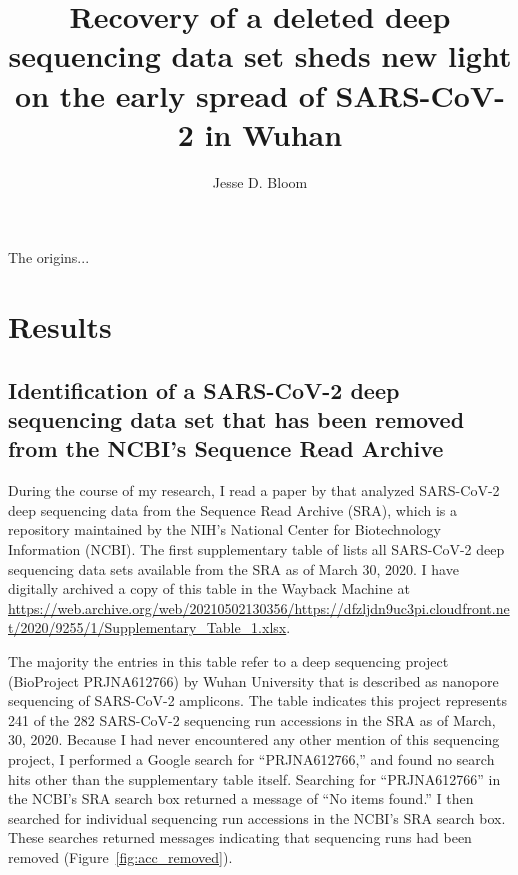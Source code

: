 \documentclass[9pt,twocolumn,twoside]{gsajnl_modified}
\title{Recovery of a deleted deep sequencing data set sheds new light on the early spread of SARS-CoV-2 in Wuhan}
\author[]{\Large Jesse D. Bloom}
\affil[]{Fred Hutchinson Cancer Research Center}
\affil[]{Howard Hughes Medical Institute}
\affil[]{Seattle, WA, USA}
\begin{document}
\maketitle
\thispagestyle{firststyle}
\firstpagefootnote

\vspace{-33pt}%

\lettrine[lines=2]{\color{color2}T}{}he origins... 

\section{Results}

\subsection{Identification of a SARS-CoV-2 deep sequencing data set that has been removed from the NCBI's Sequence Read Archive}
During the course of my research, I read a paper by \citet{farkas2020insights} that analyzed SARS-CoV-2 deep sequencing data from the Sequence Read Archive (SRA), which is a repository maintained by the NIH's National Center for Biotechnology Information (NCBI).
The first supplementary table of \citet{farkas2020insights} lists all SARS-CoV-2 deep sequencing data sets available from the SRA as of March 30, 2020.
I have digitally archived a copy of this table in the Wayback Machine at \url{https://web.archive.org/web/20210502130356/https://dfzljdn9uc3pi.cloudfront.net/2020/9255/1/Supplementary_Table_1.xlsx}. 

The majority the entries in this table refer to a deep sequencing project (BioProject PRJNA612766) by Wuhan University that is described as nanopore sequencing of SARS-CoV-2 amplicons.
The table indicates this project represents 241 of the 282 SARS-CoV-2 sequencing run accessions in the SRA as of March, 30, 2020.
Because I had never encountered any other mention of this sequencing project, I performed a Google search for ``PRJNA612766,'' and found no search hits other than the supplementary table itself.
Searching for ``PRJNA612766'' in the NCBI's SRA search box returned a message of ``No items found.''
I then searched for individual sequencing run accessions in the NCBI's SRA search box.
These searches returned messages indicating that sequencing runs had been removed (Figure~\ref{fig:acc_removed}).
\end{document}

